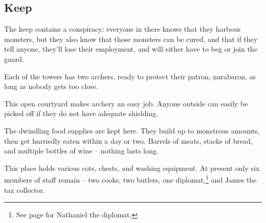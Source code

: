 \subsection{ Keep}

The keep contains a conspiracy: everyone in there knows that they harbour monsters, but they also know that those monsters can be cured, and that if they tell anyone, they'll lose their employment, and will either have to beg or join the \gls{guard}.


Each of the towers has two archers, ready to protect their patron, \gls{nurabaron}, as long as nobody gets too close.





This open courtyard makes archery an easy job.  Anyone outside can easily be picked off if they do not have adequate shielding.


The dwindling food supplies are kept here.  They build up to monstrous amounts, then get hurriedly eaten within a day or two.  Barrels of meats, stacks of bread, and multiple bottles of wine -- nothing lasts long.


This place holds various cots, chests, and washing equipment.  At present only six members of staff remain -- two cooks, two butlers, one diplomat,\footnote{See page \pageref{nathaniel} for Nathaniel the diplomat.} and James the tax collector.


